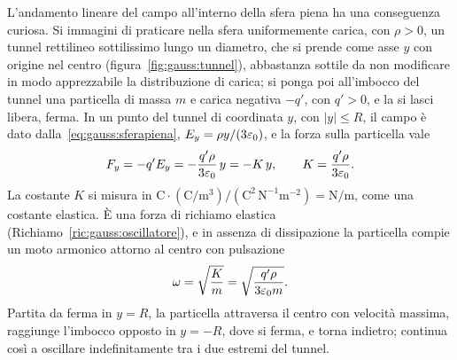 \documentclass[11pt,a4paper]{article}
\begin{document}
L'andamento lineare del campo all'interno della sfera piena ha una conseguenza curiosa. Si immagini di praticare nella sfera uniformemente carica, con $\rho>0$, un tunnel rettilineo sottilissimo lungo un diametro, che si prende come asse $y$ con origine nel centro (figura~\ref{fig:gauss:tunnel}), abbastanza sottile da non modificare in modo apprezzabile la distribuzione di carica; si ponga poi all'imbocco del tunnel una particella di massa $m$ e carica negativa $-q'$, con $q'>0$, e la si lasci libera, ferma. In un punto del tunnel di coordinata $y$, con $|y|\le R$, il campo è dato dalla~\eqref{eq:gauss:sferapiena}, $E_y=\rho y/(3\varepsilon_0)$, e la forza sulla particella vale
\[
F_y=-q'E_y=-\frac{q'\rho}{3\varepsilon_0}\,y=-K\,y ,\qquad K=\frac{q'\rho}{3\varepsilon_0}.
\]
La costante $K$ si misura in $\mathrm{C}\cdot(\mathrm{C/m^3})/(\mathrm{C^2\,N^{-1}m^{-2}})=\mathrm{N/m}$, come una costante elastica. È una forza di richiamo elastica (Richiamo~\ref{ric:gauss:oscillatore}), e in assenza di dissipazione la particella compie un moto armonico attorno al centro con pulsazione
\[
\omega=\sqrt{\frac{K}{m}}=\sqrt{\frac{q'\rho}{3\varepsilon_0 m}} .
\]
Partita da ferma in $y=R$, la particella attraversa il centro con velocità massima, raggiunge l'imbocco opposto in $y=-R$, dove si ferma, e torna indietro; continua così a oscillare indefinitamente tra i due estremi del tunnel.
\end{document}
